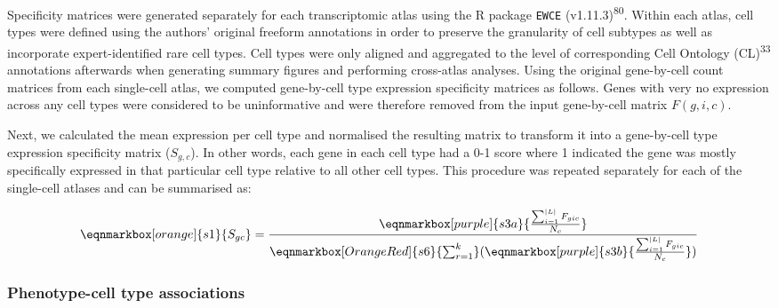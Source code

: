 \documentclass[
]{agujournal2019}
\begin{document}
Specificity matrices were generated separately for each transcriptomic
atlas using the R package \texttt{EWCE} (v1.11.3)\textsuperscript{80}.
Within each atlas, cell types were defined using the authors' original
freeform annotations in order to preserve the granularity of cell
subtypes as well as incorporate expert-identified rare cell types. Cell
types were only aligned and aggregated to the level of corresponding
Cell Ontology (CL)\textsuperscript{33} annotations afterwards when
generating summary figures and performing cross-atlas analyses. Using
the original gene-by-cell count matrices from each single-cell atlas, we
computed gene-by-cell type expression specificity matrices as follows.
Genes with very no expression across any cell types were considered to
be uninformative and were therefore removed from the input gene-by-cell
matrix \(F(g,i,c)\).

Next, we calculated the mean expression per cell type and normalised the
resulting matrix to transform it into a gene-by-cell type expression
specificity matrix (\(S_{g,c}\)). In other words, each gene in each cell
type had a 0-1 score where 1 indicated the gene was mostly specifically
expressed in that particular cell type relative to all other cell types.
This procedure was repeated separately for each of the single-cell
atlases and can be summarised as:

\hfill\break

\begin{equation*}
  \eqnmarkbox[orange]{s1}{S_{gc}}
  =
  \frac{
    \eqnmarkbox[purple]{s3a}{
      \frac{
        \sum_{i=1}^{|L|} F_{gic}
      }{
        N_c  
      }
    } 
  }{
   \eqnmarkbox[OrangeRed]{s6}{\sum_{r=1}^{k}}(
     \eqnmarkbox[purple]{s3b}{
      \frac{
        \sum_{i=1}^{|L|} F_{gic}
      }{
        N_c  
      }
    } 
   ) 
  }
\end{equation*}

\hfill\break

\subsubsection{Phenotype-cell type
associations}\label{phenotype-cell-type-associations-1}
\end{document}
